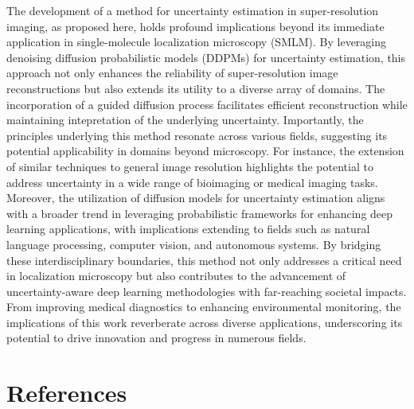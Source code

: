 \documentclass{article}
\begin{document}
The development of a method for uncertainty estimation in super-resolution imaging, as proposed here, holds profound implications beyond its immediate application in single-molecule localization microscopy (SMLM). By leveraging denoising diffusion probabilistic models (DDPMs) for uncertainty estimation, this approach not only enhances the reliability of super-resolution image reconstructions but also extends its utility to a diverse array of domains. The incorporation of a guided diffusion process facilitates efficient reconstruction while maintaining intepretation of the underlying uncertainty. Importantly, the principles underlying this method resonate across various fields, suggesting its potential applicability in domains beyond microscopy. For instance, the extension of similar techniques to general image resolution highlights the potential to address uncertainty in a wide range of bioimaging or medical imaging tasks. Moreover, the utilization of diffusion models for uncertainty estimation aligns with a broader trend in leveraging probabilistic frameworks for enhancing deep learning applications, with implications extending to fields such as natural language processing, computer vision, and autonomous systems. By bridging these interdisciplinary boundaries, this method not only addresses a critical need in localization microscopy but also contributes to the advancement of uncertainty-aware deep learning methodologies with far-reaching societal impacts. From improving medical diagnostics to enhancing environmental monitoring, the implications of this work reverberate across diverse applications, underscoring its potential to drive innovation and progress in numerous fields.

\section*{References}
\end{document}
